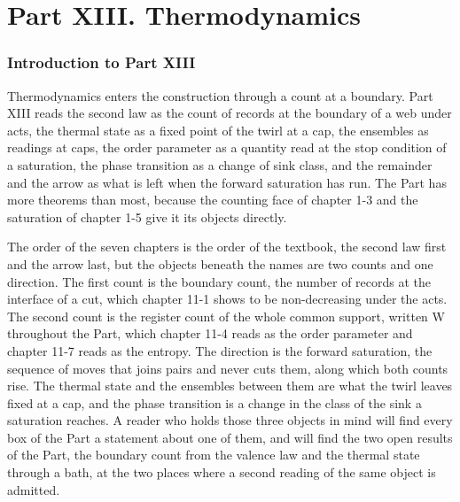 \clearpage
\part*{Part XIII. Thermodynamics}
\label{atlaspart:13-thermodynamics}
\section*{Introduction to Part XIII}\label{narr:part:XI}
Thermodynamics enters the construction through a count at a boundary. Part XIII reads the second law as the count of records at the boundary of a web under acts, the thermal state as a fixed point of the twirl at a cap, the ensembles as readings at caps, the order parameter as a quantity read at the stop condition of a saturation, the phase transition as a change of sink class, and the remainder and the arrow as what is left when the forward saturation has run. The Part has more theorems than most, because the counting face of chapter 1-3 and the saturation of chapter 1-5 give it its objects directly.

The order of the seven chapters is the order of the textbook, the second law first and the arrow last, but the objects beneath the names are two counts and one direction. The first count is the boundary count, the number of records at the interface of a cut, which chapter 11-1 shows to be non-decreasing under the acts. The second count is the register count of the whole common support, written W throughout the Part, which chapter 11-4 reads as the order parameter and chapter 11-7 reads as the entropy. The direction is the forward saturation, the sequence of moves that joins pairs and never cuts them, along which both counts rise. The thermal state and the ensembles between them are what the twirl leaves fixed at a cap, and the phase transition is a change in the class of the sink a saturation reaches. A reader who holds those three objects in mind will find every box of the Part a statement about one of them, and will find the two open results of the Part, the boundary count from the valence law and the thermal state through a bath, at the two places where a second reading of the same object is admitted.

